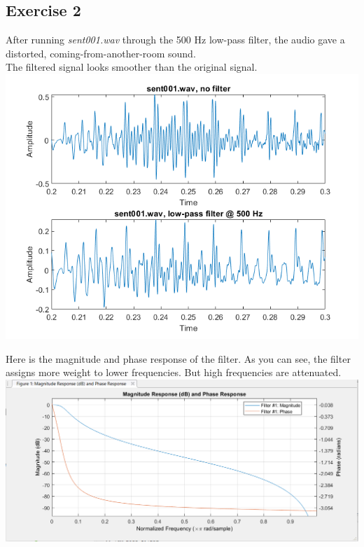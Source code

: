 \documentclass[11pt]{article}
\begin{document}
\subsection{Exercise 2}

After running \textit{sent001.wav} through the 500 Hz low-pass filter, the audio gave a distorted, coming-from-another-room sound.\\

The filtered signal looks smoother than the original signal.\\



\includegraphics[scale=0.7]{exercise2.png}

Here is the magnitude and phase response of the filter.
As you can see, the filter assigns more weight to lower frequencies.
But high frequencies are attenuated.\\

\includegraphics[scale=0.7]{low_pass_filter_response.png}
\end{document}
